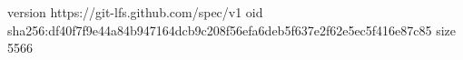 version https://git-lfs.github.com/spec/v1
oid sha256:df40f7f9e44a84b947164dcb9c208f56efa6deb5f637e2f62e5ec5f416e87c85
size 5566
